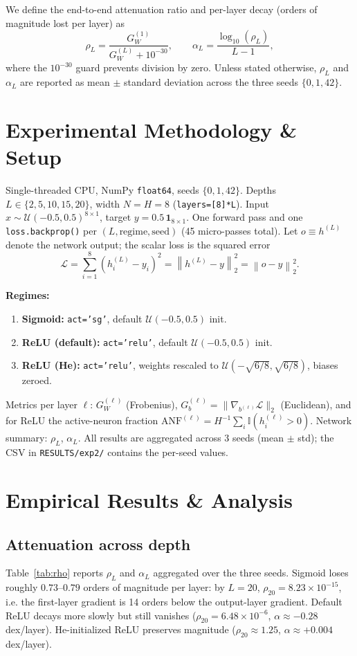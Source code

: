 \documentclass[11pt,a4paper]{article}
\begin{document}
We define the end-to-end attenuation ratio and per-layer decay (orders of magnitude lost per layer) as
\[
\rho_L = \frac{G_W^{(1)}}{G_W^{(L)} + 10^{-30}},
\qquad
\alpha_L = \frac{\log_{10}(\rho_L)}{L-1},
\]
where the $10^{-30}$ guard prevents division by zero. Unless stated otherwise, $\rho_L$ and $\alpha_L$ are reported as mean $\pm$ standard deviation across the three seeds $\{0, 1, 42\}$.

\section{Experimental Methodology \& Setup}

Single-threaded CPU, NumPy \texttt{float64}, seeds $\{0, 1, 42\}$. Depths $L \in \{2, 5, 10, 15, 20\}$, width $N = H = 8$ (\texttt{layers=[8]*L}). Input $x \sim \mathcal{U}(-0.5, 0.5)^{8\times 1}$, target $y = 0.5\,\mathbf{1}_{8\times 1}$. One forward pass and one \texttt{loss.backprop()} per $(L, \text{regime}, \text{seed})$ (45 micro-passes total). Let $o \equiv h^{(L)}$ denote the network output; the scalar loss is the squared error
\[
\mathcal{L} = \sum_{i=1}^{8} \left(h_i^{(L)} - y_i\right)^2
= \left\| h^{(L)} - y \right\|_2^2
= \left\| o - y \right\|_2^2 .
\]

\textbf{Regimes:}
\begin{enumerate}
\item \textbf{Sigmoid:} \texttt{act='sg'}, default $\mathcal{U}(-0.5, 0.5)$ init.
\item \textbf{ReLU (default):} \texttt{act='relu'}, default $\mathcal{U}(-0.5, 0.5)$ init.
\item \textbf{ReLU (He):} \texttt{act='relu'}, weights rescaled to $\mathcal{U}(-\sqrt{6/8}, \sqrt{6/8})$, biases zeroed.
\end{enumerate}

Metrics per layer $\ell$: $G_W^{(\ell)}$ (Frobenius), $G_b^{(\ell)} = \|\nabla_{b^{(\ell)}}\mathcal{L}\|_2$ (Euclidean), and for ReLU the active-neuron fraction $\text{ANF}^{(\ell)} = H^{-1}\sum_i \mathbb{I}(h_i^{(\ell)} > 0)$. Network summary: $\rho_L$, $\alpha_L$. All results are aggregated across 3 seeds (mean $\pm$ std); the CSV in \texttt{RESULTS/exp2/} contains the per-seed values.

\section{Empirical Results \& Analysis}

\subsection{Attenuation across depth}
Table~\ref{tab:rho} reports $\rho_L$ and $\alpha_L$ aggregated over the three seeds. Sigmoid loses roughly $0.73$--$0.79$ orders of magnitude per layer: by $L=20$, $\rho_{20} = 8.23 \times 10^{-15}$, i.e. the first-layer gradient is 14 orders below the output-layer gradient. Default ReLU decays more slowly but still vanishes ($\rho_{20} = 6.48 \times 10^{-6}$, $\alpha \approx -0.28$ dex/layer). He-initialized ReLU preserves magnitude ($\rho_{20} \approx 1.25$, $\alpha \approx +0.004$ dex/layer).
\end{document}
